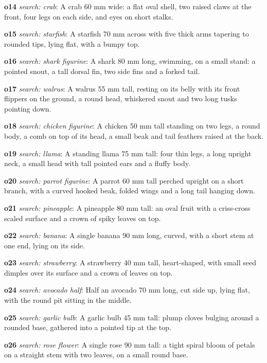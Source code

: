 {\noindent\textbf{o14} \emph{search: crab}: A crab 60 mm wide: a flat oval shell, two raised claws at the front, four legs on each side, and eyes on short stalks.\par
\noindent\textbf{o15} \emph{search: starfish}: A starfish 70 mm across with five thick arms tapering to rounded tips, lying flat, with a bumpy top.\par
\noindent\textbf{o16} \emph{search: shark figurine}: A shark 80 mm long, swimming, on a small stand: a pointed snout, a tall dorsal fin, two side fins and a forked tail.\par
\noindent\textbf{o17} \emph{search: walrus}: A walrus 55 mm tall, resting on its belly with its front flippers on the ground, a round head, whiskered snout and two long tusks pointing down.\par
\noindent\textbf{o18} \emph{search: chicken figurine}: A chicken 50 mm tall standing on two legs, a round body, a comb on top of its head, a small beak and tail feathers raised at the back.\par
\noindent\textbf{o19} \emph{search: llama}: A standing llama 75 mm tall: four thin legs, a long upright neck, a small head with tall pointed ears and a fluffy body.\par
\noindent\textbf{o20} \emph{search: parrot figurine}: A parrot 60 mm tall perched upright on a short branch, with a curved hooked beak, folded wings and a long tail hanging down.\par
\noindent\textbf{o21} \emph{search: pineapple}: A pineapple 80 mm tall: an oval fruit with a criss-cross scaled surface and a crown of spiky leaves on top.\par
\noindent\textbf{o22} \emph{search: banana}: A single banana 90 mm long, curved, with a short stem at one end, lying on its side.\par
\noindent\textbf{o23} \emph{search: strawberry}: A strawberry 40 mm tall, heart-shaped, with small seed dimples over its surface and a crown of leaves on top.\par
\noindent\textbf{o24} \emph{search: avocado half}: Half an avocado 70 mm long, cut side up, lying flat, with the round pit sitting in the middle.\par
\noindent\textbf{o25} \emph{search: garlic bulb}: A garlic bulb 45 mm tall: plump cloves bulging around a rounded base, gathered into a pointed tip at the top.\par
\noindent\textbf{o26} \emph{search: rose flower}: A single rose 90 mm tall: a tight spiral bloom of petals on a straight stem with two leaves, on a small round base.\par
}
